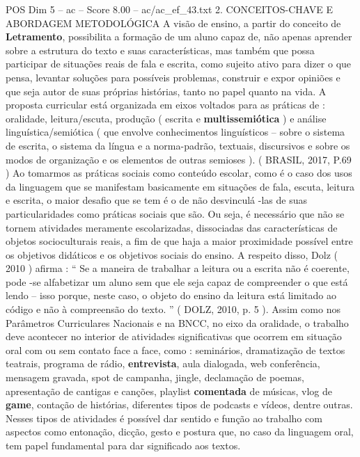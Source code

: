 \begin{textsample}{POS Dim 5 – ac – Score 8.00 – ac/ac\_ef\_43.txt}  \label{ex:f5_pos_124}
2.
CONCEITOS-CHAVE E ABORDAGEM METODOLÓGICA A visão de ensino, a partir do conceito de \textbf{Letramento}, possibilita a formação de um aluno capaz de, não apenas aprender sobre a estrutura do texto e suas características, mas também que possa participar de situações reais de fala e escrita, como sujeito ativo para dizer o que pensa, levantar soluções para possíveis problemas, construir e expor opiniões e que seja autor de suas próprias histórias, tanto no papel quanto na vida.
A proposta curricular está organizada em eixos voltados para as práticas de : oralidade, leitura/escuta, produção ( escrita e \textbf{multissemiótica} ) e análise linguística/semiótica ( que envolve conhecimentos linguísticos – sobre o sistema de escrita, o sistema da língua e a norma-padrão, textuais, discursivos e sobre os modos de organização e os elementos de outras semioses ). ( BRASIL, 2017, P.69 ) Ao tomarmos as práticas sociais como conteúdo escolar, como é o caso dos usos da linguagem que se manifestam basicamente em situações de fala, escuta, leitura e escrita, o maior desafio que se tem é o de não desvinculá -las de suas particularidades como práticas sociais que são.
Ou seja, é necessário que não se tornem atividades meramente escolarizadas, dissociadas das características de objetos socioculturais reais, a fim de que haja a maior proximidade possível entre os objetivos didáticos e os objetivos sociais do ensino.
A respeito disso, Dolz ( 2010 ) afirma : “ Se a maneira de trabalhar a leitura ou a escrita não é coerente, pode -se alfabetizar um aluno sem que ele seja capaz de compreender o que está lendo – isso porque, neste caso, o objeto do ensino da leitura está limitado ao código e não à compreensão do texto. ” ( DOLZ, 2010, p. 5 ).
Assim como nos Parâmetros Curriculares Nacionais e na BNCC, no eixo da oralidade, o trabalho deve acontecer no interior de atividades significativas que ocorrem em situação oral com ou sem contato face a face, como : seminários, dramatização de textos teatrais, programa de rádio, \textbf{entrevista}, aula dialogada, web conferência, mensagem gravada, spot de campanha, jingle, declamação de poemas, apresentação de cantigas e canções, playlist \textbf{comentada} de músicas, vlog de \textbf{game}, contação de histórias, diferentes tipos de podcasts e vídeos, dentre outras.
Nesses tipos de atividades é possível dar sentido e função ao trabalho com aspectos como entonação, dicção, gesto e postura que, no caso da linguagem oral, tem papel fundamental para dar significado aos textos.

\end{textsample}

